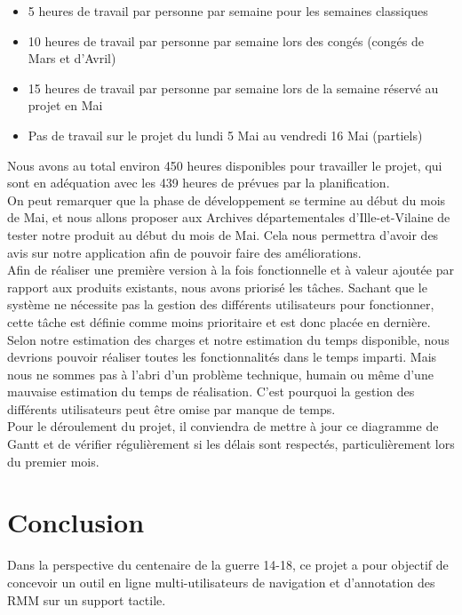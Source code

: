 \documentclass[a4paper]{article}
\begin{document}
\begin{itemize}
\item 5 heures de travail par personne par semaine pour les semaines classiques
\item 10 heures de travail par personne par semaine lors des congés (congés de Mars et d'Avril)
\item 15 heures de travail par personne par semaine lors de la semaine réservé au projet en Mai
\item Pas de travail sur le projet du lundi 5 Mai au vendredi 16 Mai (partiels)
\end{itemize}

	Nous avons au total environ 450 heures disponibles pour travailler le projet, qui sont en adéquation avec les 439 heures de prévues par la planification.\\

	On peut remarquer que la phase de développement se termine au début du mois de Mai, et nous allons proposer aux Archives départementales d’Ille-et-Vilaine de tester notre produit au début du mois de Mai. Cela nous permettra d'avoir des avis sur notre application afin de pouvoir faire des améliorations.\\

	Afin de réaliser une première version à la fois fonctionnelle et à valeur ajoutée par rapport aux produits existants, nous avons priorisé les tâches. Sachant que le système ne nécessite pas la gestion des différents utilisateurs pour fonctionner, cette tâche est définie comme moins prioritaire et est donc placée en dernière. Selon notre estimation des charges et notre estimation du temps disponible, nous devrions pouvoir réaliser toutes les fonctionnalités dans le temps imparti. Mais nous ne sommes pas à l'abri d'un problème technique, humain ou même d'une mauvaise estimation du temps de réalisation. C'est pourquoi la gestion des différents utilisateurs peut être omise par manque de temps.\\
	
	Pour le déroulement du projet, il conviendra de mettre à jour ce diagramme de Gantt et de vérifier régulièrement si les délais sont respectés, particulièrement lors du premier mois.

\newpage
{}
{}
\section*{Conclusion}

	Dans la perspective du centenaire de la guerre 14-18, ce projet a pour objectif de concevoir un outil en ligne multi-utilisateurs de navigation et d’annotation des RMM sur un support tactile.\\
	
\end{document}
